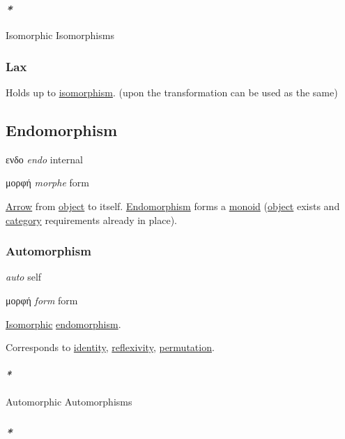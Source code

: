 \documentclass[a4paper,14pt,oneside]{book}
\begin{document}
\subsubsection{\emph{*}}
\label{sec:orgcd75bd0}

\label{orge234f1c}Isomorphic
\label{org44cbd0f}Isomorphisms

\subsubsection{\label{org8e5e9c1}Lax}
\label{sec:org6179dc9}
Holds up to \hyperref[org9c1c249]{isomorphism}.
(upon the transformation can be used as the same)

\subsection{\label{orgef71349}Endomorphism}
\label{sec:org815a1f0}
\textgreek{ενδο} \emph{endo} internal

\textgreek{μορφή} \emph{morphe} form

\hyperref[org7ee69dd]{Arrow} from \hyperref[org32ba1f2]{object} to itself.
\hyperref[orgef71349]{Endomorphism} forms a \hyperref[org2ed215c]{monoid} (\hyperref[org32ba1f2]{object} exists and \hyperref[org62e5296]{category} requirements already in place).

\subsubsection{\label{org5058a56}Automorphism}
\label{sec:org7df9285}
\textgreek{\alpha\upsilon\tau\omicron} \emph{auto} self

\textgreek{μορφή} \emph{form} form

\hyperref[orge234f1c]{Isomorphic} \hyperref[orgef71349]{endomorphism}.

Corresponds to \hyperref[org743971b]{identity}, \hyperref[orgc480023]{reflexivity}, \hyperref[orgd568f84]{permutation}.

\paragraph{\emph{*}}
\label{sec:orgddb45d7}

\label{org3da40c5}Automorphic
\label{org4daf9bb}Automorphisms

\subsubsection{\emph{*}}
\label{sec:org9489f07}
\end{document}
